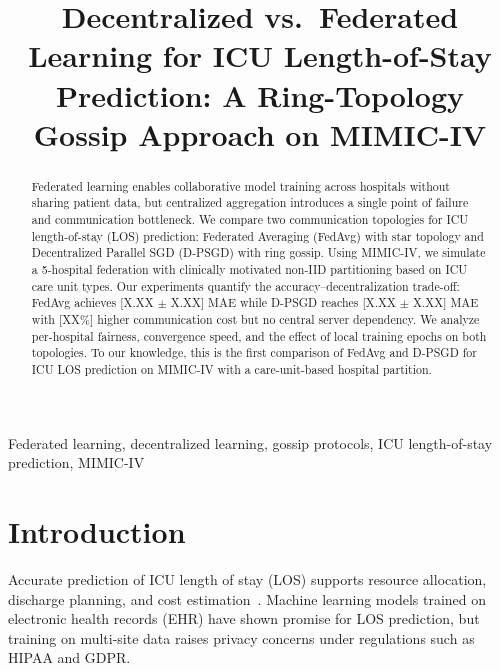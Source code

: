\documentclass[conference]{IEEEtran}
\begin{document}
\title{Decentralized vs.\ Federated Learning for ICU Length-of-Stay Prediction: A Ring-Topology Gossip Approach on MIMIC-IV}

\author{
}

\maketitle

\begin{abstract}
Federated learning enables collaborative model training across hospitals without sharing patient data, but centralized aggregation introduces a single point of failure and communication bottleneck. We compare two communication topologies for ICU length-of-stay (LOS) prediction: Federated Averaging (FedAvg) with star topology and Decentralized Parallel SGD (D-PSGD) with ring gossip. Using MIMIC-IV, we simulate a 5-hospital federation with clinically motivated non-IID partitioning based on ICU care unit types. Our experiments quantify the accuracy--decentralization trade-off: FedAvg achieves [X.XX $\pm$ X.XX] MAE while D-PSGD reaches [X.XX $\pm$ X.XX] MAE with [XX\%] higher communication cost but no central server dependency. We analyze per-hospital fairness, convergence speed, and the effect of local training epochs on both topologies. To our knowledge, this is the first comparison of FedAvg and D-PSGD for ICU LOS prediction on MIMIC-IV with a care-unit-based hospital partition.
\end{abstract}

\begin{IEEEkeywords}
Federated learning, decentralized learning, gossip protocols, ICU length-of-stay prediction, MIMIC-IV
\end{IEEEkeywords}


\section{Introduction}
\label{sec:introduction}

Accurate prediction of ICU length of stay (LOS) supports resource allocation, discharge planning, and cost estimation~\cite{}. Machine learning models trained on electronic health records (EHR) have shown promise for LOS prediction, but training on multi-site data raises privacy concerns under regulations such as HIPAA and GDPR.
\end{document}
